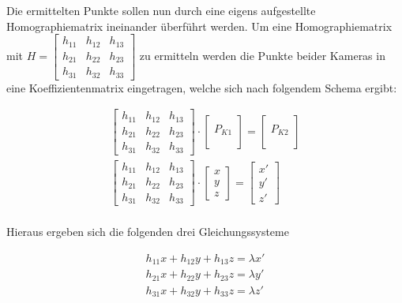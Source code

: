 Die ermittelten Punkte sollen nun durch eine eigens aufgestellte Homographiematrix ineinander überführt werden. Um eine Homographiematrix mit $
H=
\begin{bmatrix}
h_{11}&h_{12}&h_{13}\\
h_{21}&h_{22}&h_{23}\\
h_{31}&h_{32}&h_{33}
\end{bmatrix}
$ zu ermitteln werden die Punkte beider Kameras in eine Koeffizientenmatrix eingetragen, welche sich nach folgendem Schema ergibt:

\begin{gather}
\begin{bmatrix}
h_{11}&h_{12}&h_{13}\\
h_{21}&h_{22}&h_{23}\\
h_{31}&h_{32}&h_{33}
\end{bmatrix}
\cdot
\begin{bmatrix}
\\P_{K1}\\\\
\end{bmatrix}
=
\begin{bmatrix}
\\P_{K2}\\\\
\end{bmatrix}\\
\begin{bmatrix}
h_{11}&h_{12}&h_{13}\\
h_{21}&h_{22}&h_{23}\\
h_{31}&h_{32}&h_{33}
\end{bmatrix}
\cdot
\begin{bmatrix}
x\\y\\z
\end{bmatrix}
=
\begin{bmatrix}
x'\\y'\\z'
\end{bmatrix}\\
\end{gather}

Hieraus ergeben sich die folgenden drei Gleichungssysteme

\begin{gather}
h_{11}x+h_{12}y+h_{13}z= \lambda x'\\
h_{21}x+h_{22}y+h_{23}z= \lambda y'\\
h_{31}x+h_{32}y+h_{33}z= \lambda z'
\end{gather}

